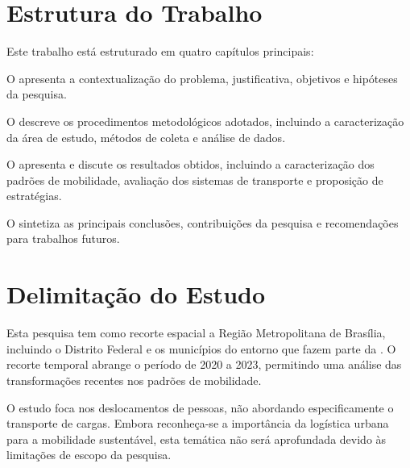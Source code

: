 \section{Estrutura do Trabalho}

Este trabalho está estruturado em quatro capítulos principais:

O  apresenta a contextualização do problema, justificativa, objetivos e hipóteses da pesquisa.

O  descreve os procedimentos metodológicos adotados, incluindo a caracterização da área de estudo, métodos de coleta e análise de dados.

O  apresenta e discute os resultados obtidos, incluindo a caracterização dos padrões de mobilidade, avaliação dos sistemas de transporte e proposição de estratégias.

O  sintetiza as principais conclusões, contribuições da pesquisa e recomendações para trabalhos futuros.

\section{Delimitação do Estudo}

Esta pesquisa tem como recorte espacial a Região Metropolitana de Brasília, incluindo o Distrito Federal e os municípios do entorno que fazem parte da . O recorte temporal abrange o período de 2020 a 2023, permitindo uma análise das transformações recentes nos padrões de mobilidade.

O estudo foca nos deslocamentos de pessoas, não abordando especificamente o transporte de cargas. Embora reconheça-se a importância da logística urbana para a mobilidade sustentável, esta temática não será aprofundada devido às limitações de escopo da pesquisa.